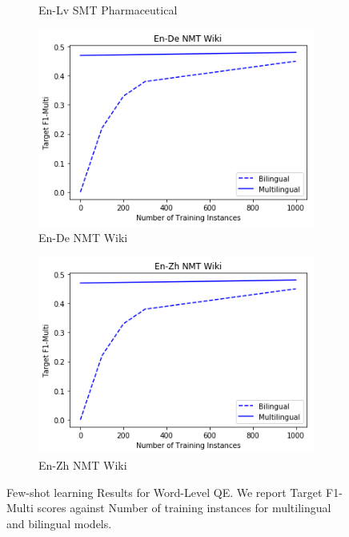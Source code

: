 \begin{figure}
\begin{subfigure}[b]{\figlength}
		\caption{En-Lv SMT Pharmaceutical}
		\label{fig:en_lv_smt_pharm_results}
	\end{subfigure}
	\begin{subfigure}[b]{\figlength}
		\centering\includegraphics[width=\figlength]{figures/translation_quality_estimation/word_level/en_de_nmt_wiki.png}
		\caption{En-De NMT Wiki}
		\label{fig:en_de_nmt_wiki_results}
	\end{subfigure}
	\begin{subfigure}[b]{\figlength}
		\centering\includegraphics[width=\figlength]{figures/translation_quality_estimation/word_level/en_zh_nmt_wiki.png}
		\caption{En-Zh NMT Wiki}
		\label{fig:en_zh_nmt_wiki_results}
	\end{subfigure}
	\caption{Few-shot learning Results for Word-Level QE. We report Target F1-Multi scores against Number of training instances for multilingual and bilingual models.}
	\label{fig:fewshot_results}
\end{figure}

